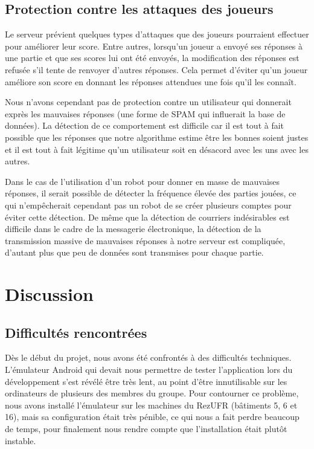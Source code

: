 \documentclass[a4paper,11pt,french]{article}
\def\android{Android\texttrademark{}}
\begin{document}
\subsection{Protection contre les attaques des joueurs}

Le serveur prévient quelques types d'attaques que des joueurs pourraient effectuer pour améliorer leur score. Entre autres, lorsqu'un joueur
a envoyé ses réponses à une partie et que ses scores lui ont été envoyés, la modification des réponses est refusée s'il tente de renvoyer
d'autres réponses. Cela permet d'éviter qu'un joueur améliore son score en donnant les réponses attendues une fois qu'il les connaît.

Nous n'avons cependant pas de protection contre un utilisateur qui donnerait exprès les mauvaises réponses (une forme de SPAM qui influerait
la base de données). La détection de ce comportement est difficile car il est tout à fait possible que les réponses que notre algorithme
estime être les bonnes soient justes et il est tout à fait légitime qu'un utilisateur soit en désacord avec les uns avec les autres.

Dans le cas de l'utilisation d'un robot pour donner en masse de mauvaises réponses, il serait possible de détecter la fréquence élevée des
parties jouées, ce qui n'empêcherait cependant pas un robot de se créer plusieurs comptes pour éviter cette détection. De même que la
détection de courriers indésirables est difficile dans le cadre de la messagerie électronique, la détection de la transmission massive de
mauvaises réponses à notre serveur est compliquée, d'autant plus que peu de données sont transmises pour chaque partie.





\section{Discussion}
\subsection{Difficultés rencontrées}
\label{sec:difficultes}
Dès le début du projet, nous avons été confrontés à des difficultés techniques. L'émulateur \android{} qui devait nous permettre de tester
l'application lors du développement s'est révélé être très lent, au point d'être innutilisable sur les ordinateurs de plusieurs des membres
du groupe. Pour contourner ce problème, nous avons installé l'émulateur sur les machines du RezUFR (bâtiments 5, 6 et 16), mais sa
configuration était très pénible, ce qui nous a fait perdre beaucoup de temps, pour finalement nous rendre compte que l'installation était
plutôt instable.
\end{document}
